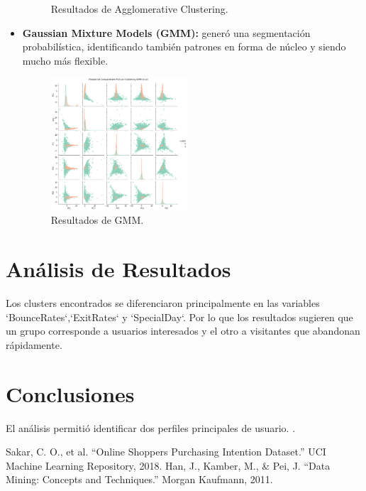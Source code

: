 \documentclass[conference]{IEEEtran}
\begin{document}
\begin{itemize}
\begin{figure}[H]
            \caption{Resultados de Agglomerative Clustering.}
            \label{fig:agglomerative}
        \end{figure}
    \item \textbf{Gaussian Mixture Models (GMM):} generó una segmentación probabilística, identificando también patrones en forma de núcleo y siendo mucho más flexible.
        \begin{figure}[H]
            \centering
            \includegraphics[width=0.48\textwidth]{images/gmm.png}
            \caption{Resultados de GMM.}
            \label{fig:gmm}
        \end{figure}
\end{itemize}

\section{Análisis de Resultados}
Los clusters encontrados se diferenciaron principalmente en las variables `BounceRates`,`ExitRates` y `SpecialDay`. Por lo que los resultados sugieren que un grupo corresponde a usuarios interesados y el otro a visitantes que abandonan rápidamente.

\section{Conclusiones}
El análisis permitió identificar dos perfiles principales de usuario. .

\begin{thebibliography}{99}
 Sakar, C. O., et al. “Online Shoppers Purchasing Intention Dataset.” UCI Machine Learning Repository, 2018.
 Han, J., Kamber, M., \& Pei, J. “Data Mining: Concepts and Techniques.” Morgan Kaufmann, 2011.
\end{thebibliography}
\end{document}
